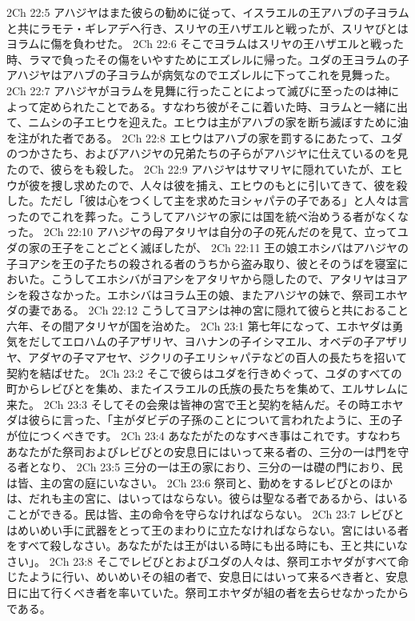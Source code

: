 2Ch 22:5  アハジヤはまた彼らの勧めに従って、イスラエルの王アハブの子ヨラムと共にラモテ・ギレアデへ行き、スリヤの王ハザエルと戦ったが、スリヤびとはヨラムに傷を負わせた。
2Ch 22:6  そこでヨラムはスリヤの王ハザエルと戦った時、ラマで負ったその傷をいやすためにエズレルに帰った。ユダの王ヨラムの子アハジヤはアハブの子ヨラムが病気なのでエズレルに下ってこれを見舞った。
2Ch 22:7  アハジヤがヨラムを見舞に行ったことによって滅びに至ったのは神によって定められたことである。すなわち彼がそこに着いた時、ヨラムと一緒に出て、ニムシの子エヒウを迎えた。エヒウは主がアハブの家を断ち滅ぼすために油を注がれた者である。
2Ch 22:8  エヒウはアハブの家を罰するにあたって、ユダのつかさたち、およびアハジヤの兄弟たちの子らがアハジヤに仕えているのを見たので、彼らをも殺した。
2Ch 22:9  アハジヤはサマリヤに隠れていたが、エヒウが彼を捜し求めたので、人々は彼を捕え、エヒウのもとに引いてきて、彼を殺した。ただし「彼は心をつくして主を求めたヨシャパテの子である」と人々は言ったのでこれを葬った。こうしてアハジヤの家には国を統べ治めうる者がなくなった。
2Ch 22:10  アハジヤの母アタリヤは自分の子の死んだのを見て、立ってユダの家の王子をことごとく滅ぼしたが、
2Ch 22:11  王の娘エホシバはアハジヤの子ヨアシを王の子たちの殺される者のうちから盗み取り、彼とそのうばを寝室においた。こうしてエホシバがヨアシをアタリヤから隠したので、アタリヤはヨアシを殺さなかった。エホシバはヨラム王の娘、またアハジヤの妹で、祭司エホヤダの妻である。
2Ch 22:12  こうしてヨアシは神の宮に隠れて彼らと共におること六年、その間アタリヤが国を治めた。
2Ch 23:1  第七年になって、エホヤダは勇気をだしてエロハムの子アザリヤ、ヨハナンの子イシマエル、オベデの子アザリヤ、アダヤの子マアセヤ、ジクリの子エリシャパテなどの百人の長たちを招いて契約を結ばせた。
2Ch 23:2  そこで彼らはユダを行きめぐって、ユダのすべての町からレビびとを集め、またイスラエルの氏族の長たちを集めて、エルサレムに来た。
2Ch 23:3  そしてその会衆は皆神の宮で王と契約を結んだ。その時エホヤダは彼らに言った、「主がダビデの子孫のことについて言われたように、王の子が位につくべきです。
2Ch 23:4  あなたがたのなすべき事はこれです。すなわちあなたがた祭司およびレビびとの安息日にはいって来る者の、三分の一は門を守る者となり、
2Ch 23:5  三分の一は王の家におり、三分の一は礎の門におり、民は皆、主の宮の庭にいなさい。
2Ch 23:6  祭司と、勤めをするレビびとのほかは、だれも主の宮に、はいってはならない。彼らは聖なる者であるから、はいることができる。民は皆、主の命令を守らなければならない。
2Ch 23:7  レビびとはめいめい手に武器をとって王のまわりに立たなければならない。宮にはいる者をすべて殺しなさい。あなたがたは王がはいる時にも出る時にも、王と共にいなさい」。
2Ch 23:8  そこでレビびとおよびユダの人々は、祭司エホヤダがすべて命じたように行い、めいめいその組の者で、安息日にはいって来るべき者と、安息日に出て行くべき者を率いていた。祭司エホヤダが組の者を去らせなかったからである。
